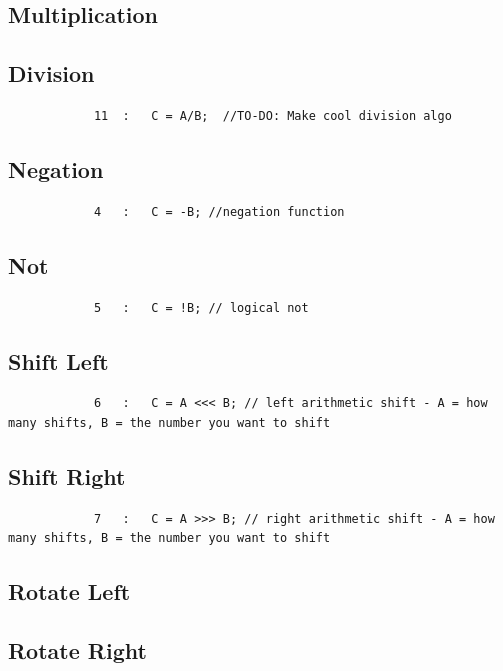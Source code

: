 \documentclass{article}
\begin{document}
    \subsection{Multiplication}
        
    \subsection{Division}
        \begin{lstlisting}
            11  :   C = A/B;  //TO-DO: Make cool division algo
        \end{lstlisting}
    \subsection{Negation}
        \begin{lstlisting}
            4   :   C = -B; //negation function
        \end{lstlisting}
    \subsection{Not}
        \begin{lstlisting}
            5   :   C = !B; // logical not 
        \end{lstlisting}
    \subsection{Shift Left}
        \begin{lstlisting}
            6   :   C = A <<< B; // left arithmetic shift - A = how many shifts, B = the number you want to shift 
        \end{lstlisting}
    \subsection{Shift Right}
        \begin{lstlisting}
            7   :   C = A >>> B; // right arithmetic shift - A = how many shifts, B = the number you want to shift 
        \end{lstlisting}
    \subsection{Rotate Left}
        
    \subsection{Rotate Right}
        
\end{document}
